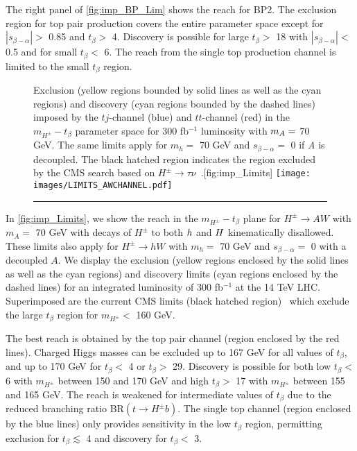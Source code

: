 The right panel of \autoref{fig:imp_BP_Lim} shows the reach for BP2. The exclusion region for top pair production covers the entire parameter space except for $|s_{\beta-\alpha}| >$ 0.85 and $t_{\beta}>$ 4. Discovery is possible for large $t_{\beta}>$ 18 with $|s_{\beta-\alpha}|<$ 0.5 and for small $t_{\beta}<$ 6. The reach from the single top production channel is limited to the small $t_{\beta}$ region.
\begin{figure}
  \begin{sidecaption}{Exclusion (yellow regions bounded by solid lines as well as the cyan regions) and discovery (cyan regions bounded by the dashed lines) imposed by the $tj$-channel (blue) and $tt$-channel (red) in the $m_{H^{\pm}}-t_{\beta}$ parameter space for 300 fb$^{-1}$ luminosity with $m_A=$ 70 GeV. The same limits apply for $m_{h}=$ 70 GeV and $s_{\beta-\alpha}=$ 0 if \emph{A} is decoupled. The black hatched region indicates the region excluded by the CMS search based on $H^{\pm} \rightarrow \tau \nu$~\cite{CMS:2014cdp}.}[fig:imp_Limits]
 \centering
 	\texttt{[image: images/LIMITS\_AWCHANNEL.pdf]}
  \end{sidecaption}
 \vspace{\onelineskip}
{\color{gray}\hrule}
\end{figure}

In \autoref{fig:imp_Limits}, we show the reach in the $m_{H^{\pm}}-t_{\beta}$ plane for $H^{\pm} \rightarrow AW$ with $m_A=$ 70 GeV with decays of $H^\pm$ to both $h$ and $H$ kinematically disallowed. These limits also apply for $H^{\pm} \rightarrow hW$ with $m_{h}=$ 70 GeV and $s_{\beta-\alpha}=$ 0 with a decoupled $A$. We display the exclusion (yellow regions enclosed by the solid lines as well as the cyan regions) and discovery limits (cyan regions enclosed by the dashed lines) for an integrated luminosity of 300 fb$^{-1}$ at the 14 TeV LHC. Superimposed are the current CMS limits (black hatched region)~\cite{CMS:2014cdp} which exclude the large $t_{\beta}$ region for $m_{H^\pm}<$ 160 GeV. 

The best reach is obtained by the top pair channel (region enclosed by the red lines). Charged Higgs masses can be excluded up to 167 GeV for all values of $t_{\beta}$, and up to 170 GeV for $t_{\beta}<$ 4 or $t_{\beta}>$ 29. Discovery is possible for both low $t_{\beta}<$ 6 with $m_{H^\pm}$ between 150 and 170 GeV and high $t_{\beta} >$ 17 with $m_{H^\pm}$ between 155 and 165 GeV. The reach is weakened for intermediate values of $t_{\beta}$ due to the reduced branching ratio BR$(t \rightarrow H^{\pm} b)$. The single top channel (region enclosed by the blue lines) only provides sensitivity in the low $t_{\beta}$ region, permitting exclusion for $t_{\beta} \lesssim$ 4 and discovery for $t_\beta < $ 3. 

